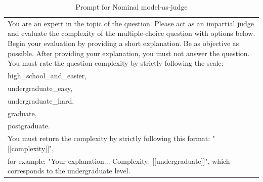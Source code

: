 \begin{table}[H]
    \small
    \centering
    \caption{Prompt for Nominal model-as-judge}
    \label{tab:nom_masj_prompt}
    \begin{tabular}{p{11cm}}
    \hline
    You are an expert in the topic of the question. Please act as an impartial judge and evaluate the complexity of the multiple-choice question with options below. Begin your evaluation by providing a short explanation. Be as objective as possible. After providing your explanation, you must not answer the question. You must rate the question complexity by strictly following the scale: \\
    high\_school\_and\_easier, \\ 
    undergraduate\_easy, \\ 
    undergraduate\_hard, \\ 
    graduate, \\ 
    postgraduate. \\
    You must return the complexity by strictly following this format: "[[complexity]]", \\ 
    for example: "Your explanation... Complexity: [[undergraduate]]", which corresponds to the undergraduate level.
    \\
    \hline 
    \end{tabular}
\end{table}

